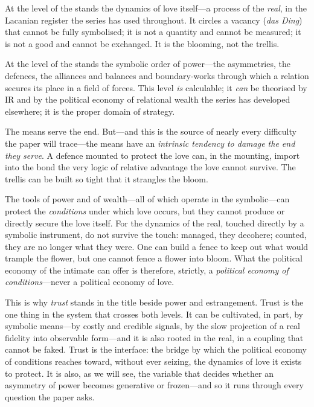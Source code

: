 At the level of the  stands the dynamics of love itself---a process of the \emph{real}, in the Lacanian register the series has used throughout. It circles a vacancy (\emph{das Ding}) that cannot be fully symbolised; it is not a quantity and cannot be measured; it is not a good and cannot be exchanged. It is the blooming, not the trellis.

At the level of the  stands the symbolic order of power---the asymmetries, the defences, the alliances and balances and boundary-works through which a relation secures its place in a field of forces. This level \emph{is} calculable; it \emph{can} be theorised by IR and by the political economy of relational wealth the series has developed elsewhere; it is the proper domain of strategy.

The means serve the end. But---and this is the source of nearly every difficulty the paper will trace---the means have an \emph{intrinsic tendency to damage the end they serve}. A defence mounted to protect the love can, in the mounting, import into the bond the very logic of relative advantage the love cannot survive. The trellis can be built so tight that it strangles the bloom.

\begin{claim}
The tools of power and of wealth---all of which operate in the symbolic---can protect the \emph{conditions} under which love occurs, but they cannot produce or directly secure the love itself. For the dynamics of the real, touched directly by a symbolic instrument, do not survive the touch: managed, they decohere; counted, they are no longer what they were. One can build a fence to keep out what would trample the flower, but one cannot fence a flower into bloom. What the political economy of the intimate can offer is therefore, strictly, a \emph{political economy of conditions}---never a political economy of love.
\end{claim}

This is why \emph{trust} stands in the title beside power and estrangement. Trust is the one thing in the system that crosses both levels. It can be cultivated, in part, by symbolic means---by costly and credible signals, by the slow projection of a real fidelity into observable form---and it is also rooted in the real, in a coupling that cannot be faked. Trust is the interface: the bridge by which the political economy of conditions reaches toward, without ever seizing, the dynamics of love it exists to protect. It is also, as we will see, the variable that decides whether an asymmetry of power becomes generative or frozen---and so it runs through every question the paper asks.

